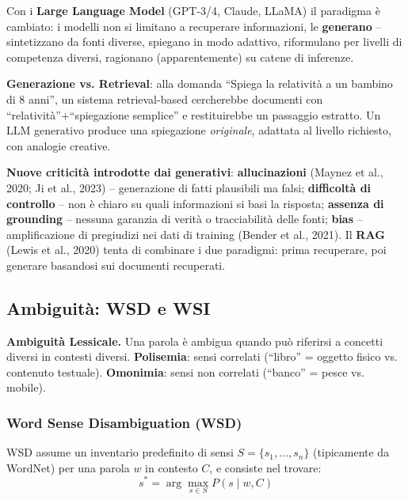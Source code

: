 \documentclass[12pt,a4paper]{article}
\begin{document}
Con i \textbf{Large Language Model} (GPT-3/4, Claude, LLaMA) il paradigma \`e cambiato: i modelli non si limitano a recuperare informazioni, le \textbf{generano} -- sintetizzano da fonti diverse, spiegano in modo adattivo, riformulano per livelli di competenza diversi, ragionano (apparentemente) su catene di inferenze.

\begin{quizbox}
\textbf{Generazione vs. Retrieval}: alla domanda ``Spiega la relativit\`a a un bambino di 8 anni'', un sistema retrieval-based cercherebbe documenti con ``relativit\`a''+``spiegazione semplice'' e restituirebbe un passaggio estratto. Un LLM generativo produce una spiegazione \emph{originale}, adattata al livello richiesto, con analogie creative.
\end{quizbox}

\textbf{Nuove criticit\`a introdotte dai generativi}: \textbf{allucinazioni} (Maynez et al., 2020; Ji et al., 2023) -- generazione di fatti plausibili ma falsi; \textbf{difficolt\`a di controllo} -- non \`e chiaro su quali informazioni si basi la risposta; \textbf{assenza di grounding} -- nessuna garanzia di verit\`a o tracciabilit\`a delle fonti; \textbf{bias} -- amplificazione di pregiudizi nei dati di training (Bender et al., 2021). Il \textbf{RAG} (Lewis et al., 2020) tenta di combinare i due paradigmi: prima recuperare, poi generare basandosi sui documenti recuperati.

\subsection{Ambiguit\`a: WSD e WSI}

\begin{defbox}
\textbf{Ambiguit\`a Lessicale.}
Una parola \`e ambigua quando pu\`o riferirsi a concetti diversi in contesti diversi. \textbf{Polisemia}: sensi correlati (``libro'' = oggetto fisico vs. contenuto testuale). \textbf{Omonimia}: sensi non correlati (``banco'' = pesce vs. mobile).
\end{defbox}

\subsubsection{Word Sense Disambiguation (WSD)}

\begin{formulabox}
WSD assume un inventario predefinito di sensi $S=\{s_1,\dots,s_n\}$ (tipicamente da WordNet) per una parola $w$ in contesto $C$, e consiste nel trovare:
\[
s^* = \arg\max_{s \in S} P(s \mid w, C)
\]
\end{formulabox}
\end{document}
